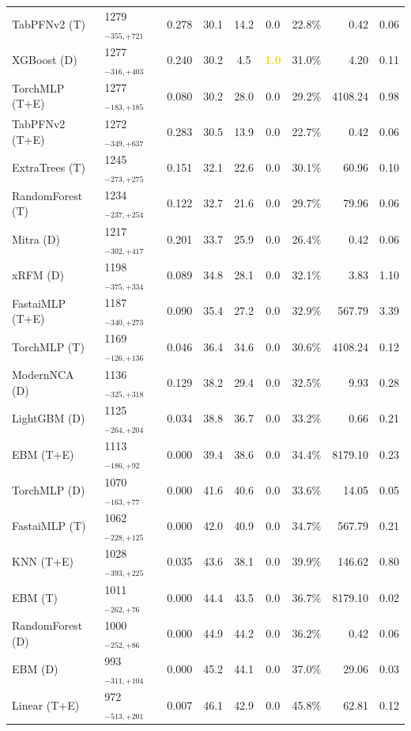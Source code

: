 \begin{tabular}{llcccccrr}
TabPFNv2 (T) & 1279${}_{-355,+721}$ & 0.278 & 30.1 & 14.2 & 0.0 & 22.8\% & 0.42 & 0.06 \\
XGBoost (D) & 1277${}_{-316,+403}$ & 0.240 & 30.2 & 4.5 & \textcolor{gold}{\textbf{1.0}} & 31.0\% & 4.20 & 0.11 \\
TorchMLP (T+E) & 1277${}_{-183,+185}$ & 0.080 & 30.2 & 28.0 & 0.0 & 29.2\% & 4108.24 & 0.98 \\
TabPFNv2 (T+E) & 1272${}_{-349,+637}$ & 0.283 & 30.5 & 13.9 & 0.0 & 22.7\% & 0.42 & 0.06 \\
ExtraTrees (T) & 1245${}_{-273,+275}$ & 0.151 & 32.1 & 22.6 & 0.0 & 30.1\% & 60.96 & 0.10 \\
RandomForest (T) & 1234${}_{-237,+254}$ & 0.122 & 32.7 & 21.6 & 0.0 & 29.7\% & 79.96 & 0.06 \\
Mitra (D) & 1217${}_{-302,+417}$ & 0.201 & 33.7 & 25.9 & 0.0 & 26.4\% & 0.42 & 0.06 \\
xRFM (D) & 1198${}_{-375,+334}$ & 0.089 & 34.8 & 28.1 & 0.0 & 32.1\% & 3.83 & 1.10 \\
FastaiMLP (T+E) & 1187${}_{-340,+273}$ & 0.090 & 35.4 & 27.2 & 0.0 & 32.9\% & 567.79 & 3.39 \\
TorchMLP (T) & 1169${}_{-126,+136}$ & 0.046 & 36.4 & 34.6 & 0.0 & 30.6\% & 4108.24 & 0.12 \\
ModernNCA (D) & 1136${}_{-325,+318}$ & 0.129 & 38.2 & 29.4 & 0.0 & 32.5\% & 9.93 & 0.28 \\
LightGBM (D) & 1125${}_{-264,+204}$ & 0.034 & 38.8 & 36.7 & 0.0 & 33.2\% & 0.66 & 0.21 \\
EBM (T+E) & 1113${}_{-186,+92}$ & 0.000 & 39.4 & 38.6 & 0.0 & 34.4\% & 8179.10 & 0.23 \\
TorchMLP (D) & 1070${}_{-163,+77}$ & 0.000 & 41.6 & 40.6 & 0.0 & 33.6\% & 14.05 & 0.05 \\
FastaiMLP (T) & 1062${}_{-228,+125}$ & 0.000 & 42.0 & 40.9 & 0.0 & 34.7\% & 567.79 & 0.21 \\
KNN (T+E) & 1028${}_{-393,+225}$ & 0.035 & 43.6 & 38.1 & 0.0 & 39.9\% & 146.62 & 0.80 \\
EBM (T) & 1011${}_{-262,+76}$ & 0.000 & 44.4 & 43.5 & 0.0 & 36.7\% & 8179.10 & 0.02 \\
RandomForest (D) & 1000${}_{-252,+86}$ & 0.000 & 44.9 & 44.2 & 0.0 & 36.2\% & 0.42 & 0.06 \\
EBM (D) & 993${}_{-311,+104}$ & 0.000 & 45.2 & 44.1 & 0.0 & 37.0\% & 29.06 & 0.03 \\
Linear (T+E) & 972${}_{-513,+201}$ & 0.007 & 46.1 & 42.9 & 0.0 & 45.8\% & 62.81 & 0.12 \\

\end{tabular}
